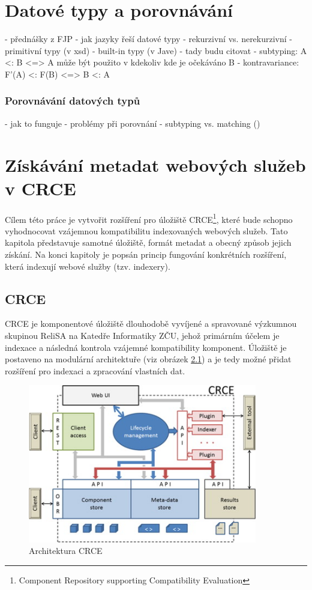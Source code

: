 \documentclass[czech,DP]{thesiskiv}
\begin{document}
\chapter{Datové typy a porovnávání}

- přednášky z FJP
- jak jazyky řeší datové typy
	- rekurzivní vs. nerekurzivní
- primitivní typy (v xsd)
- built-in typy (v Jave)
- tady budu citovat \cite{abadi1995subytping}
	- subtyping: A <: B <=> A může být použito v kdekoliv kde je očekáváno B
	- kontravariance: F'(A) <: F(B) <=> B <: A

\subsection{Porovnávání datových typů}

 - jak to funguje
 - problémy při porovnání
 - subtyping vs. matching (\cite{abadi1995subytping})


\chapter{Získávání metadat webových služeb v CRCE}
\label{sec:crce}

Cílem této práce je vytvořit rozšíření pro úložiště CRCE\footnote{Component Repository supporting Compatibility Evaluation}, které bude schopno vyhodnocovat vzájemnou kompatibilitu indexovaných webových služeb. Tato kapitola představuje samotné úložiště, formát metadat a obecný způsob jejich získání. Na konci kapitoly je popsán princip fungování konkrétních rozšíření, která indexují webové služby (tzv. indexery).

\section{CRCE}

CRCE je komponentové úložiště dlouhodobě vyvíjené a spravované výzkumnou skupinou ReliSA na Katedře Informatiky ZČU, jehož primárním účelem je indexace a následná kontrola vzájemné kompatibility komponent. Úložiště je postaveno na modulární architektuře (viz obrázek \ref{fig:crce-arch}) a je tedy možné přidat rozšíření pro indexaci a zpracování vlastních dat.

\begin{figure}[h]
	\centering
	\includegraphics[width=10cm]{crce-arch.jpg}
	\caption{Architektura CRCE}
	\label{fig:crce-arch}
\end{figure} 
\end{document}
